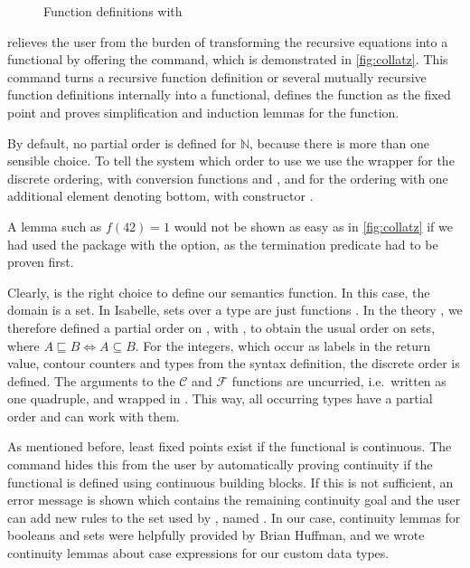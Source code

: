 \documentclass[a4paper,parskip=half,BCOR=8mm,DIV=calc,12pt]{scrbook}
\newcommand{\C}{\mathcal C}
\newcommand{\F}{\mathcal F}
\newcommand{\N}{\mathds N}
\begin{document}
\begin{figure}
\begin{framed}

\end{framed}
\caption{Function definitions with }
\label{fig:collatz}
\end{figure}

 relieves the user from the burden of transforming the recursive equations into a functional by offering the  command, which is demonstrated in \vref{fig:collatz}. This command turns a recursive function definition or several mutually recursive function definitions internally into a functional, defines the function as the fixed point and proves simplification and induction lemmas for the function.

By default, no partial order is defined for $\N$, because there is more than one sensible choice. To tell the system which order to use we use the wrapper  for the discrete ordering, with conversion functions  and , and  for the ordering with one additional element denoting bottom, with constructor .

A lemma such as $f(42)=1$ would not be shown as easy as in \vref{fig:collatz} if we had used the  package with the  option, as the termination predicate had to be proven first.

Clearly,  is the right choice to define our semantics function. In this case, the domain is a set. In Isabelle, sets over a type  are just functions . In the theory , we therefore defined a partial order on , with , to obtain the usual order on sets, where $A \sqsubseteq B \iff A \subseteq B$. For the integers, which occur as labels in the return value, contour counters and types from the syntax definition, the discrete order is defined. The arguments to the $\C$ and $\F$ functions are uncurried, i.e.\ written as one quadruple, and wrapped in . This way, all occurring types have a partial order and  can work with them.

As mentioned before, least fixed points exist if the functional is continuous. The  command hides this from the user by automatically proving continuity if the functional is defined using continuous building blocks. If this is not sufficient, an error message is shown which contains the remaining continuity goal and the user can add new rules to the set used by , named . In our case, continuity lemmas for booleans and sets were helpfully provided by Brian Huffman, and we wrote continuity lemmas about case expressions for our custom data types.
\end{document}
